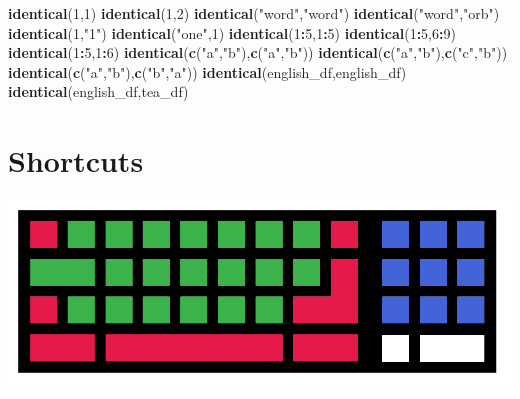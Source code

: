 \documentclass[]{book}
\newenvironment{Shaded}{\begin{snugshade}}{\end{snugshade}}
\newcommand{\KeywordTok}[1]{\textcolor[rgb]{0.13,0.29,0.53}{\textbf{#1}}}
\newcommand{\DecValTok}[1]{\textcolor[rgb]{0.00,0.00,0.81}{#1}}
\newcommand{\StringTok}[1]{\textcolor[rgb]{0.31,0.60,0.02}{#1}}
\newcommand{\OperatorTok}[1]{\textcolor[rgb]{0.81,0.36,0.00}{\textbf{#1}}}
\newcommand{\NormalTok}[1]{#1}
\begin{document}
\begin{Shaded}
\begin{Highlighting}[]
\KeywordTok{identical}\NormalTok{(}\DecValTok{1}\NormalTok{,}\DecValTok{1}\NormalTok{)}
\KeywordTok{identical}\NormalTok{(}\DecValTok{1}\NormalTok{,}\DecValTok{2}\NormalTok{)}
\KeywordTok{identical}\NormalTok{(}\StringTok{"word"}\NormalTok{,}\StringTok{"word"}\NormalTok{)}
\KeywordTok{identical}\NormalTok{(}\StringTok{"word"}\NormalTok{,}\StringTok{"orb"}\NormalTok{)}
\KeywordTok{identical}\NormalTok{(}\DecValTok{1}\NormalTok{,}\StringTok{"1"}\NormalTok{)}
\KeywordTok{identical}\NormalTok{(}\StringTok{"one"}\NormalTok{,}\DecValTok{1}\NormalTok{)}
\KeywordTok{identical}\NormalTok{(}\DecValTok{1}\OperatorTok{:}\DecValTok{5}\NormalTok{,}\DecValTok{1}\OperatorTok{:}\DecValTok{5}\NormalTok{)}
\KeywordTok{identical}\NormalTok{(}\DecValTok{1}\OperatorTok{:}\DecValTok{5}\NormalTok{,}\DecValTok{6}\OperatorTok{:}\DecValTok{9}\NormalTok{)}
\KeywordTok{identical}\NormalTok{(}\DecValTok{1}\OperatorTok{:}\DecValTok{5}\NormalTok{,}\DecValTok{1}\OperatorTok{:}\DecValTok{6}\NormalTok{)}
\KeywordTok{identical}\NormalTok{(}\KeywordTok{c}\NormalTok{(}\StringTok{"a"}\NormalTok{,}\StringTok{"b"}\NormalTok{),}\KeywordTok{c}\NormalTok{(}\StringTok{"a"}\NormalTok{,}\StringTok{"b"}\NormalTok{))}
\KeywordTok{identical}\NormalTok{(}\KeywordTok{c}\NormalTok{(}\StringTok{"a"}\NormalTok{,}\StringTok{"b"}\NormalTok{),}\KeywordTok{c}\NormalTok{(}\StringTok{"c"}\NormalTok{,}\StringTok{"b"}\NormalTok{))}
\KeywordTok{identical}\NormalTok{(}\KeywordTok{c}\NormalTok{(}\StringTok{"a"}\NormalTok{,}\StringTok{"b"}\NormalTok{),}\KeywordTok{c}\NormalTok{(}\StringTok{"b"}\NormalTok{,}\StringTok{"a"}\NormalTok{))}
\KeywordTok{identical}\NormalTok{(english_df,english_df)}
\KeywordTok{identical}\NormalTok{(english_df,tea_df)}
\end{Highlighting}
\end{Shaded}

\section{Shortcuts}\label{shortcuts}

\begin{center}\includegraphics[width=0.3\linewidth]{figures/keyboard} \end{center}
\end{document}
